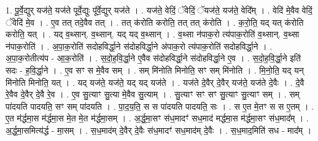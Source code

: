 \documentclass[17pt]{extarticle}
\begin{document}
1. पू॒र्वे॒द्युर् यज॑ते॒ यज॑ते पूर्वे॒द्युः पू᳚र्वे॒द्युर् यज॑ते । . यज॑ते॒ वेदिं॒ ॅवेदिं॒ ॅयज॑ते॒ यज॑ते॒ वेदि᳚म् । . वेदि॑ मे॒वैव वेदिं॒ ॅवेदि॑ मे॒व । . ए॒व तत् तदे॒वैव तत् । . तत् क॑रोति करोति॒ तत् तत् क॑रोति । . क॒रो॒ति॒ यद् यत् क॑रोति करोति॒ यत् । . यद् व॒थ्सान्. व॒थ्सान्. यद् यद् व॒थ्सान् । . व॒थ्सा न॑पाक॒रो त्य॑पाक॒रोति॑ व॒थ्सान्. व॒थ्सा न॑पाक॒रोति॑ । . अ॒पा॒क॒रोति॑ सदोहविर्द्धा॒ने स॑दोहविर्द्धा॒ने अ॑पाक॒रो त्य॑पाक॒रोति॑ सदोहविर्द्धा॒ने । . अ॒पा॒क॒रोतीत्य॑प - आ॒क॒रोति॑ । . स॒दो॒ह॒वि॒र्द्धा॒ने ए॒वैव स॑दोहविर्द्धा॒ने स॑दोहविर्द्धा॒ने ए॒व । . स॒दो॒ह॒वि॒र्द्धा॒ने इति॑ सदः - ह॒वि॒र्द्धा॒ने । . ए॒व सꣳ स मे॒वैव सम् । . सम् मि॑नोति मिनोति॒ सꣳ सम् मि॑नोति । . मि॒नो॒ति॒ यद् यन् मि॑नोति मिनोति॒ यत् । . यद् यज॑ते॒ यज॑ते॒ यद् यद् यज॑ते । . यज॑ते दे॒वैर् दे॒वैर् यज॑ते॒ यज॑ते दे॒वैः । . दे॒वै रे॒वैव दे॒वैर् दे॒वै रे॒व । . ए॒व सु॒त्याꣳ सु॒त्या मे॒वैव सु॒त्याम् । . सु॒त्याꣳ सꣳ सꣳ सु॒त्याꣳ सु॒त्याꣳ सम् । . सम् पा॑दयति पादयति॒ सꣳ सम् पा॑दयति । . पा॒द॒य॒ति॒ स स पा॑दयति पादयति॒ सः । . स ए॒त मे॒तꣳ स स ए॒तम् । . ए॒त म॑र्द्धमा॒स म॑र्द्धमा॒स मे॒त मे॒त म॑र्द्धमा॒सम् । . अ॒र्द्ध॒मा॒सꣳ स॑ध॒मादꣳ॑ सध॒माद॑ मर्द्धमा॒स म॑र्द्धमा॒सꣳ स॑ध॒माद᳚म् । . अ॒र्द्ध॒मा॒समित्य॑र्द्ध - मा॒सम् । . स॒ध॒माद॑म् दे॒वैर् दे॒वैः स॑ध॒मादꣳ॑ सध॒माद॑म् दे॒वैः । . स॒ध॒माद॒मिति॑ सध - माद᳚म् । \newline
\end{document}
